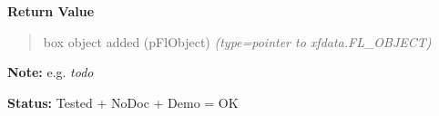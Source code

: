 \begin{boxedminipage}{\funcwidth}
\begin{quote}
      \end{quote}

      \textbf{Return Value}
    \vspace{-1ex}

      \begin{quote}

box object added (pFlObject)
      {\it (type=pointer to xfdata.FL\_OBJECT)}

      \end{quote}

\textbf{Note:} 
e.g. \emph{todo}


\textbf{Status:} 
Tested + NoDoc + Demo = OK


    \end{boxedminipage}

    \label{xformslib:flmisc:fl_stuff_clipboard}

    \vspace{0.5ex}

